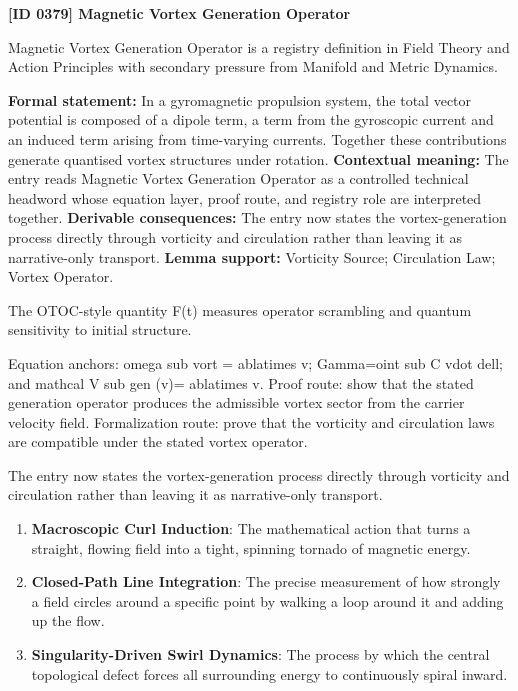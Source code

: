 \clearpage
\noindent\textbf{[ID 0379] Magnetic Vortex Generation Operator}\par
\vspace{0.35em}
\begingroup\small
{}
Magnetic Vortex Generation Operator is a registry definition in Field Theory and Action Principles with secondary pressure from Manifold and Metric Dynamics.

\begingroup\footnotesize\setlength{\emergencystretch}{3em}\sloppy
\textbf{Formal statement:} In a gyromagnetic propulsion system, the total vector potential is composed of a dipole term, a term from the gyroscopic current and an induced term arising from time-varying currents. Together these contributions generate quantised vortex structures under rotation. \textbf{Contextual meaning:} The entry reads Magnetic Vortex Generation Operator as a controlled technical headword whose equation layer, proof route, and registry role are interpreted together. \textbf{Derivable consequences:} The entry now states the vortex-generation process directly through vorticity and circulation rather than leaving it as narrative-only transport. \textbf{Lemma support:} Vorticity Source; Circulation Law; Vortex Operator.\par
\endgroup

The OTOC-style quantity F(t) measures operator scrambling and quantum sensitivity to initial structure.

Equation anchors: omega sub vort = ablatimes v; Gamma=oint sub C vdot dell; and mathcal V sub gen (v)= ablatimes v. Proof route: show that the stated generation operator produces the admissible vortex sector from the carrier velocity field. Formalization route: prove that the vorticity and circulation laws are compatible under the stated vortex operator.

The entry now states the vortex-generation process directly through vorticity and circulation rather than leaving it as narrative-only transport.
\endgroup

\begin{enumerate}[leftmargin=1.6em,itemsep=6pt,topsep=4pt]
\item \textbf{Macroscopic Curl Induction}: The mathematical action that turns a straight, flowing field into a tight, spinning tornado of magnetic energy.
\item \textbf{Closed-Path Line Integration}: The precise measurement of how strongly a field circles around a specific point by walking a loop around it and adding up the flow.
\item \textbf{Singularity-Driven Swirl Dynamics}: The process by which the central topological defect forces all surrounding energy to continuously spiral inward.
\end{enumerate}

